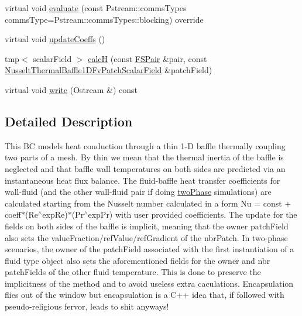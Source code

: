 \begin{DoxyCompactItemize}
virtual void \hyperlink{classFoam_1_1compressible_1_1NusseltThermalBaffle1DFvPatchScalarField_acdb997d230f71ac2f22a7a8574af909f}{evaluate} (const Pstream\+::comms\+Types comms\+Type=Pstream\+::comms\+Types\+::blocking) override
\item 
virtual void \hyperlink{classFoam_1_1compressible_1_1NusseltThermalBaffle1DFvPatchScalarField_a7e24eafac629d3733181cd942d4c902f}{update\+Coeffs} ()
\item 
tmp$<$ scalar\+Field $>$ \hyperlink{classFoam_1_1compressible_1_1NusseltThermalBaffle1DFvPatchScalarField_aa5d38c7d49e82a9ac1b3b73153ba3526}{calcH} (const \hyperlink{classFoam_1_1FSPair}{F\+S\+Pair} \&pair, const \hyperlink{classFoam_1_1compressible_1_1NusseltThermalBaffle1DFvPatchScalarField}{Nusselt\+Thermal\+Baffle1\+D\+Fv\+Patch\+Scalar\+Field} \&patch\+Field)
\item 
virtual void \hyperlink{classFoam_1_1compressible_1_1NusseltThermalBaffle1DFvPatchScalarField_a293fdfec8bdfbd5c3913ab4c9f3454ff}{write} (Ostream \&) const
\end{DoxyCompactItemize}


\subsection{Detailed Description}
This BC models heat conduction through a thin 1-\/D baffle thermally coupling two parts of a mesh. By \textquotesingle{}thin\textquotesingle{} we mean that the thermal inertia of the baffle is neglected and that baffle wall temperatures on both sides are predicted via an instantaneous heat flux balance. The fluid-\/baffle heat transfer coefficients for wall-\/fluid (and the other wall-\/fluid pair if doing \hyperlink{classFoam_1_1twoPhase}{two\+Phase} simulations) are calculated starting from the Nusselt number calculated in a form Nu = const + coeff$\ast$(Re$^\wedge$exp\+Re)$\ast$(Pr$^\wedge$exp\+Pr) with user provided coefficients. The update for the fields on both sides of the baffle is implicit, meaning that the owner patch\+Field also sets the value\+Fraction/ref\+Value/ref\+Gradient of the nbr\+Patch. In two-\/phase scenarios, the owner of the patch\+Field associated with the first instantiation of a fluid type object also sets the aforementioned fields for the owner and nbr patch\+Fields of the other fluid temperature. This is done to preserve the implicitness of the method and to avoid useless extra caculations. Encapsulation flies out of the window but encapsulation is a C++ idea that, if followed with pseudo-\/religious fervor, leads to shit anyways! 

